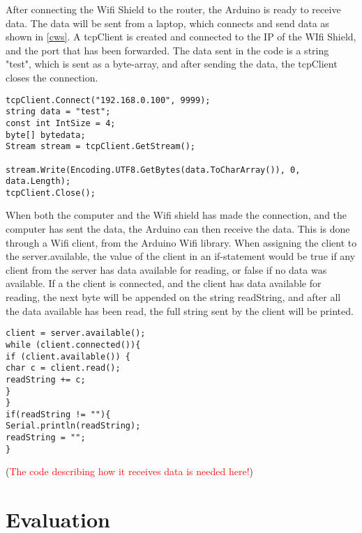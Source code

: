 After connecting the Wifi Shield to the router, the Arduino is ready to receive data. The data will be sent from a laptop, which connects and send data as shown in \ref{cws}. A tcpClient is created and connected to the IP of the WIfi Shield, and the port that has been forwarded. The data sent in the code is a string "test", which is sent as a byte-array, and after sending the data, the tcpClient closes the connection.

\begin{lstlisting}[caption={Connecting the computer to the Wifi Shield}, label={cws}]
tcpClient.Connect("192.168.0.100", 9999);
string data = "test";
const int IntSize = 4;
byte[] bytedata;
Stream stream = tcpClient.GetStream();

stream.Write(Encoding.UTF8.GetBytes(data.ToCharArray()), 0, data.Length);
tcpClient.Close();
\end{lstlisting}

When both the computer and the Wifi shield has made the connection, and the computer has sent the data, the Arduino can then receive the data. This is done through a Wifi client, from the Arduino Wifi library. When assigning the client to the server.available, the value of the client in an if-statement would be true if any client from the server has data available for reading, or false if no data was available. If a the client is connected, and the client has data available for reading, the next byte will be appended on the string readString, and after all the data available has been read, the full string sent by the client will be printed.

\begin{lstlisting}[caption={Receiving data from the computer}, label={rdc}]
client = server.available();
while (client.connected()){
if (client.available()) {
char c = client.read(); 
readString += c;
}
}
if(readString != ""){
Serial.println(readString);
readString = "";
}
\end{lstlisting}

(\textcolor{red}{The code describing how it receives data is needed here!})

\section{Evaluation}
\label{sec:i2Evaluation}

